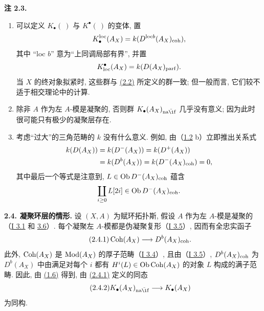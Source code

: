 \textbf{注 2.3.}
\begin{enumerate}[label=\alph*)]
\item 可以定义 \(K_{\bullet}(\ )\) 与 \(K^{\bullet}(\ )\) 的变体, 置
\[
 K_{\bullet}^{\mathrm{loc}}(A_X)=k(D^{\mathrm{loc} b}(A_X)_{\operatorname{coh}}),
\]
其中 ``loc \(b\)'' 意为“上同调局部有界”, 并置
\[
 K^{\bullet}_{\mathrm{loc}}(A_X)=k(D(A_X)_{\operatorname{parf}}).
\]
当 \(X\) 的终对象拟紧时, 这些群与 \hyperlink{sga6.e04.def.2-2}{(2.2)} 所定义的群一致; 但一般而言, 它们较不适于相交理论中的计算.
\item 除非 \(A\) 作为左 \(A\)-模是凝聚的, 否则群 \(K_{\bullet}(A_X)_{\naif}\) 几乎没有意义; 因为此时很可能只有极少的凝聚层存在.
\item 考虑“过大”的三角范畴的 \(k\) 没有什么意义. 例如, 由（\hyperlink{sga6.e04.lem.1-2}{1.2} b）立即推出关系式
\[
\begin{aligned}
 k(D(A_X))&=k(D^-(A_X))=k(D^+(A_X))\\
 &=k(D^b(A_X))=k(D^-(A_X)_{\operatorname{coh}})=0,
\end{aligned}
\]
其中最后一个等式是注意到, \(L\in\operatorname{Ob} D^-(A_X)_{\operatorname{coh}}\) 蕴含
\[
 \coprod_{i\geq0}L[2i]\in\operatorname{Ob} D^-(A_X)_{\operatorname{coh}}.
\]
\end{enumerate}

\textbf{2.4. 凝聚环层的情形.} 设 \((X,A)\) 为赋环拓扑斯, 假设 \(A\) 作为左 \(A\)-模是凝聚的（\hyperlink{sga6.e01.def.3-1}{I 3.1} 和 \hyperlink{sga6.e01.ex.3-6}{3.6}）. 每个凝聚左 \(A\)-模都是伪凝聚复形（\hyperlink{sga6.e01.cor.3-5}{I 3.5}）, 因而有全忠实函子
\begin{equation}\tag{2.4.1}
 \operatorname{Coh}(A_X)\longrightarrow D^b(A_X)_{\operatorname{coh}}.
\end{equation}
此外, \(\operatorname{Coh}(A_X)\) 是 \(\operatorname{Mod}(A_X)\) 的厚子范畴（\hyperlink{sga6.e01.cor.3-4}{I 3.4}）, 且由（\hyperlink{sga6.e01.cor.3-5}{I 3.5}）, \(D^b(A_X)_{\operatorname{coh}}\) 为 \(D^b(A_X)\) 中由满足对每个 \(i\) 都有 \(H^i(L)\in\operatorname{Ob}\operatorname{Coh}(A_X)\) 的对象 \(L\) 构成的满子范畴. 因此, 由 \hyperlink{sga6.e04.lem.1-6}{(1.6)} 得到, 由 \hyperlink{sga6.e04.eq.2-4-1}{(2.4.1)} 定义的同态
\begin{equation}\tag{2.4.2}
 K_{\bullet}(A_X)_{\naif}\longrightarrow K_{\bullet}(A_X)
\end{equation}
为同构.

